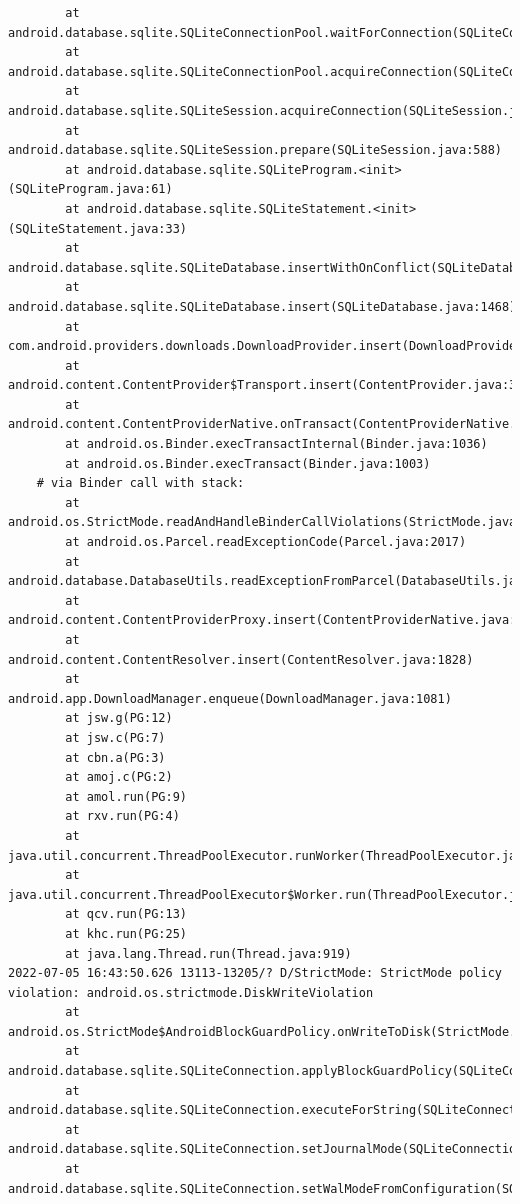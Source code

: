 \documentclass[a4paper,12pt]{book}
\begin{document}
\begin{lstlisting}
        at android.database.sqlite.SQLiteConnectionPool.waitForConnection(SQLiteConnectionPool.java:699)
        at android.database.sqlite.SQLiteConnectionPool.acquireConnection(SQLiteConnectionPool.java:380)
        at android.database.sqlite.SQLiteSession.acquireConnection(SQLiteSession.java:896)
        at android.database.sqlite.SQLiteSession.prepare(SQLiteSession.java:588)
        at android.database.sqlite.SQLiteProgram.<init>(SQLiteProgram.java:61)
        at android.database.sqlite.SQLiteStatement.<init>(SQLiteStatement.java:33)
        at android.database.sqlite.SQLiteDatabase.insertWithOnConflict(SQLiteDatabase.java:1597)
        at android.database.sqlite.SQLiteDatabase.insert(SQLiteDatabase.java:1468)
        at com.android.providers.downloads.DownloadProvider.insert(DownloadProvider.java:972)
        at android.content.ContentProvider$Transport.insert(ContentProvider.java:309)
        at android.content.ContentProviderNative.onTransact(ContentProviderNative.java:154)
        at android.os.Binder.execTransactInternal(Binder.java:1036)
        at android.os.Binder.execTransact(Binder.java:1003)
    # via Binder call with stack:
        at android.os.StrictMode.readAndHandleBinderCallViolations(StrictMode.java:2289)
        at android.os.Parcel.readExceptionCode(Parcel.java:2017)
        at android.database.DatabaseUtils.readExceptionFromParcel(DatabaseUtils.java:137)
        at android.content.ContentProviderProxy.insert(ContentProviderNative.java:481)
        at android.content.ContentResolver.insert(ContentResolver.java:1828)
        at android.app.DownloadManager.enqueue(DownloadManager.java:1081)
        at jsw.g(PG:12)
        at jsw.c(PG:7)
        at cbn.a(PG:3)
        at amoj.c(PG:2)
        at amol.run(PG:9)
        at rxv.run(PG:4)
        at java.util.concurrent.ThreadPoolExecutor.runWorker(ThreadPoolExecutor.java:1167)
        at java.util.concurrent.ThreadPoolExecutor$Worker.run(ThreadPoolExecutor.java:641)
        at qcv.run(PG:13)
        at khc.run(PG:25)
        at java.lang.Thread.run(Thread.java:919)
2022-07-05 16:43:50.626 13113-13205/? D/StrictMode: StrictMode policy violation: android.os.strictmode.DiskWriteViolation
        at android.os.StrictMode$AndroidBlockGuardPolicy.onWriteToDisk(StrictMode.java:1527)
        at android.database.sqlite.SQLiteConnection.applyBlockGuardPolicy(SQLiteConnection.java:1140)
        at android.database.sqlite.SQLiteConnection.executeForString(SQLiteConnection.java:733)
        at android.database.sqlite.SQLiteConnection.setJournalMode(SQLiteConnection.java:376)
        at android.database.sqlite.SQLiteConnection.setWalModeFromConfiguration(SQLiteConnection.java:316)

\end{lstlisting}
\end{document}
